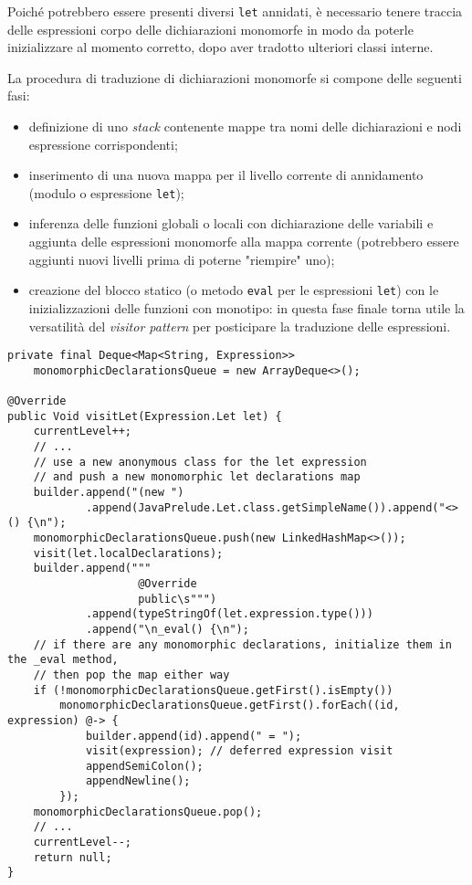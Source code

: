\newpage

\noindent Poiché potrebbero essere presenti diversi \texttt{let} annidati, è necessario tenere traccia delle espressioni
corpo delle dichiarazioni monomorfe in modo da poterle inizializzare al momento corretto, dopo aver tradotto ulteriori classi interne.

\noindent La procedura di traduzione di dichiarazioni monomorfe si compone delle seguenti fasi:
\begin{itemize}
    \item definizione di uno \textit{stack} contenente mappe tra nomi delle dichiarazioni e nodi espressione corrispondenti;
    \item inserimento di una nuova mappa per il livello corrente di annidamento (modulo o espressione \texttt{let});
    \item inferenza delle funzioni globali o locali con dichiarazione delle variabili e aggiunta delle espressioni monomorfe
          alla mappa corrente (potrebbero essere aggiunti nuovi livelli prima di poterne "riempire" uno);
    \item creazione del blocco statico (o metodo \texttt{eval} per le espressioni \texttt{let}) con le inizializzazioni
          delle funzioni con monotipo: in questa fase finale torna utile la versatilità del \textit{visitor pattern} per posticipare
          la traduzione delle espressioni.
\end{itemize}

\vspace{4mm}
\begin{lstlisting}[caption={Traduzione di funzioni monomorfe in \texttt{let}}, style=javaCode, label={lst:5-13-monomorphic-translation-java}]
private final Deque<Map<String, Expression>>
    monomorphicDeclarationsQueue = new ArrayDeque<>();

@Override
public Void visitLet(Expression.Let let) {
    currentLevel++;
    // ...
    // use a new anonymous class for the let expression
    // and push a new monomorphic let declarations map
    builder.append("(new ")
            .append(JavaPrelude.Let.class.getSimpleName()).append("<>() {\n");
    monomorphicDeclarationsQueue.push(new LinkedHashMap<>());
    visit(let.localDeclarations);
    builder.append("""
                    @Override
                    public\s""")
            .append(typeStringOf(let.expression.type()))
            .append("\n_eval() {\n");
    // if there are any monomorphic declarations, initialize them in the _eval method,
    // then pop the map either way
    if (!monomorphicDeclarationsQueue.getFirst().isEmpty())
        monomorphicDeclarationsQueue.getFirst().forEach((id, expression) @-> {
            builder.append(id).append(" = ");
            visit(expression); // deferred expression visit
            appendSemiColon();
            appendNewline();
        });
    monomorphicDeclarationsQueue.pop();
    // ...
    currentLevel--;
    return null;
}
\end{lstlisting}

